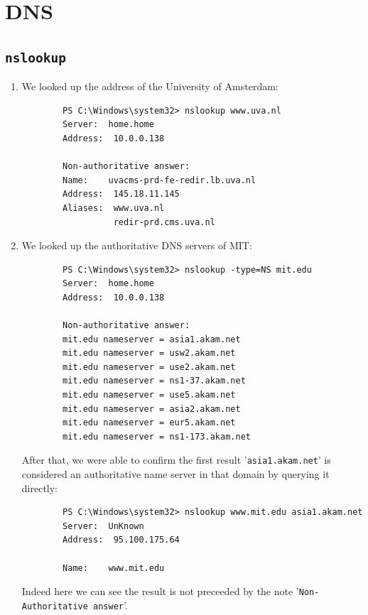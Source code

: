 \section{DNS}
\subsection{\texttt{nslookup}}
\begin{enumerate}[label=\textbf{\alph*.}]
    \item We looked up the address of the University of Amsterdam:
    \begin{verbatim}
        PS C:\Windows\system32> nslookup www.uva.nl
        Server:  home.home
        Address:  10.0.0.138
        
        Non-authoritative answer:
        Name:    uvacms-prd-fe-redir.lb.uva.nl
        Address:  145.18.11.145
        Aliases:  www.uva.nl
                  redir-prd.cms.uva.nl        
    \end{verbatim}
    \item We looked up the authoritative DNS servers of MIT:
    \begin{verbatim}
        PS C:\Windows\system32> nslookup -type=NS mit.edu
        Server:  home.home
        Address:  10.0.0.138
        
        Non-authoritative answer:
        mit.edu nameserver = asia1.akam.net
        mit.edu nameserver = usw2.akam.net
        mit.edu nameserver = use2.akam.net
        mit.edu nameserver = ns1-37.akam.net
        mit.edu nameserver = use5.akam.net
        mit.edu nameserver = asia2.akam.net
        mit.edu nameserver = eur5.akam.net
        mit.edu nameserver = ns1-173.akam.net
    \end{verbatim}
    After that, we were able to confirm the first result '\texttt{asia1.akam.net}'
    is considered an authoritative name server in that domain by querying it directly:
    \begin{verbatim}
        PS C:\Windows\system32> nslookup www.mit.edu asia1.akam.net
        Server:  UnKnown
        Address:  95.100.175.64

        Name:    www.mit.edu
    \end{verbatim}
    Indeed here we can see the result is not preceeded by the note '\texttt{Non-Authoritative answer}'.
\end{enumerate}


